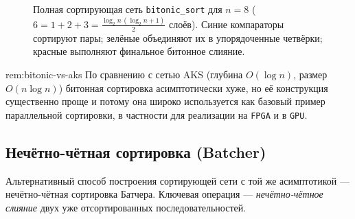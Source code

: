 \begin{figure}[H]
	\caption{Полная сортирующая сеть \texttt{bitonic\_sort} для $n=8$
		($6=1+2+3=\tfrac{\log_2 n\,(\log_2 n+1)}{2}$ слоёв).
		{\color{blue}Синие} компараторы сортируют пары;
		{\color{teal}зелёные} объединяют их в упорядоченные четвёрки;
		{\color{red!80!black}красные} выполняют финальное битонное слияние.}
	\label{fig:bitonic-sort-full}
\end{figure}

\begin{Remark}{}{rem:bitonic-vs-aks}
	По сравнению с сетью AKS (глубина $O(\log n)$, размер $O(n\log n)$) битонная сортировка асимптотически хуже, но её конструкция существенно проще и потому она широко используется как базовый пример параллельной сортировки, в частности для реализации на \texttt{FPGA} и в \texttt{GPU}.
\end{Remark}

\subsection{Нечётно-чётная сортировка (Batcher)}

Альтернативный способ построения сортирующей сети с той же асимптотикой --- нечётно-чётная сортировка Батчера.
Ключевая операция --- \emph{нечётно-чётное слияние} двух уже отсортированных последовательностей.

